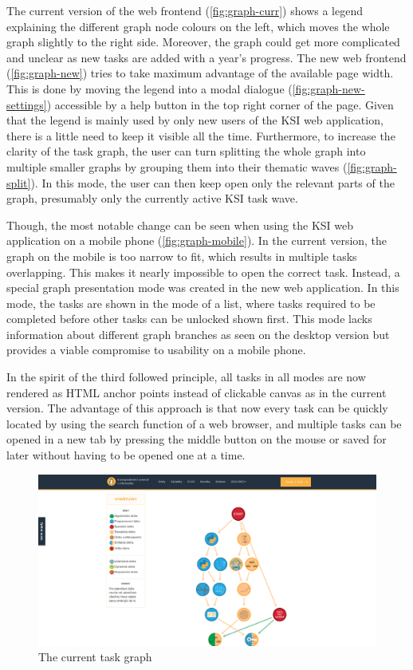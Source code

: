 \documentclass[
  digital, %
  oneside, %
  lof,     %
  nolot,     %
]{fithesis4}
\begin{document}
{The current version of the web frontend (\autoref{fig:graph-curr}) shows a legend explaining the different graph node colours on the left, which moves the whole graph slightly to the right side. Moreover, the graph could get more complicated and unclear as new tasks are added with a year's progress. The new web frontend (\autoref{fig:graph-new}) tries to take maximum advantage of the available page width. This is done by moving the legend into a modal dialogue (\autoref{fig:graph-new-settings}) accessible by a help button in the top right corner of the page. Given that the legend is mainly used by only new users of the \acrshort{KSI} web application, there is a little need to keep it visible all the time. Furthermore, to increase the clarity of the task graph, the user can turn splitting the whole graph into multiple smaller graphs by grouping them into their thematic waves (\autoref{fig:graph-split}). In this mode, the user can then keep open only the relevant parts of the graph, presumably only the currently active \acrshort{KSI} task wave.

Though, the most notable change can be seen when using the \acrshort{KSI} web application on a mobile phone (\autoref{fig:graph-mobile}). In the current version, the graph on the mobile is too narrow to fit, which results in multiple tasks overlapping. This makes it nearly impossible to open the correct task. Instead, a special graph presentation mode was created in the new web application. In this mode, the tasks are shown in the mode of a list, where tasks required to be completed before other tasks can be unlocked shown first. This mode lacks information about different graph branches as seen on the desktop version but provides a viable compromise to usability on a mobile phone.

In the spirit of the third followed principle, all tasks in all modes are now rendered as HTML anchor points instead of clickable canvas as in the current version. The advantage of this approach is that now every task can be quickly located by using the search function of a web browser, and multiple tasks can be opened in a new tab by pressing the middle button on the mouse or saved for later without having to be opened one at a time.

\begin{figure}
\includegraphics[width=\textwidth]{assets/img/graph_curr}
\caption{The current task graph}
\label{fig:graph-curr}
\end{figure}

}
\end{document}

